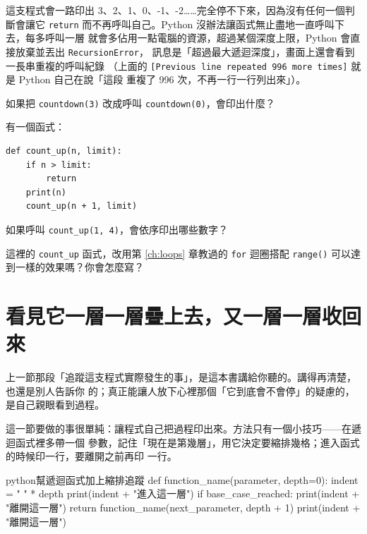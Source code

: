 這支程式會一路印出 3、2、1、0、-1、-2……完全停不下來，因為沒有任何一個判斷會讓它
\texttt{return} 而不再呼叫自己。Python 沒辦法讓函式無止盡地一直呼叫下去，每多呼叫一層
就會多佔用一點電腦的資源，超過某個深度上限，Python 會直接放棄並丟出
\texttt{RecursionError}，
訊息是「超過最大遞迴深度」，畫面上還會看到一長串重複的呼叫紀錄
（上面的 \texttt{[Previous line repeated 996 more times]} 就是 Python 自己在說「這段
重複了 996 次，不再一行一行列出來」）。


\begin{drills}[label=drills:recursion-basics]
\item 如果把 \texttt{countdown(3)} 改成呼叫 \texttt{countdown(0)}，會印出什麼？
\item 有一個函式：
\begin{verbatim}
def count_up(n, limit):
    if n > limit:
        return
    print(n)
    count_up(n + 1, limit)
\end{verbatim}
如果呼叫 \texttt{count\_up(1, 4)}，會依序印出哪些數字？
\item 這裡的 \texttt{count\_up} 函式，改用第 \ref{ch:loops} 章教過的 \texttt{for} 迴圈搭配
\texttt{range()} 可以達到一樣的效果嗎？你會怎麼寫？
\end{drills}

\section{看見它一層一層疊上去，又一層一層收回來}
\label{sec:recursion-trace}

上一節那段「追蹤這支程式實際發生的事」，是這本書講給你聽的。講得再清楚，也還是別人告訴你
的；真正能讓人放下心裡那個「它到底會不會停」的疑慮的，是自己親眼看到過程。

這一節要做的事很單純：讓程式自己把過程印出來。方法只有一個小技巧——在遞迴函式裡多帶一個
參數，記住「現在是第幾層」，用它決定要縮排幾格；進入函式的時候印一行，要離開之前再印
一行。

\begin{code}{python}{幫遞迴函式加上縮排追蹤}
def function_name(parameter, depth=0):
    indent = "    " * depth
    print(indent + "進入這一層")
    if base_case_reached:
        print(indent + "離開這一層")
        return
    function_name(next_parameter, depth + 1)
    print(indent + "離開這一層")
\end{code}

